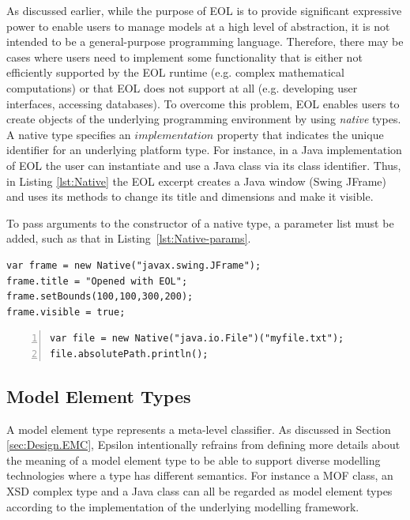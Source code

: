 As discussed earlier, while the purpose of EOL is to provide significant expressive power to enable users to manage models at a high level of abstraction, it is not intended to be a general-purpose programming language. Therefore, there may be cases where users need to implement some functionality that is either not efficiently supported by the EOL runtime (e.g. complex mathematical computations) or that EOL does not support at all (e.g. developing user interfaces, accessing databases). To overcome this problem, EOL enables users to create objects of the underlying programming environment by using \emph{native} types. A native type specifies an $implementation$ property that indicates the unique identifier for an underlying platform type. For instance, in a Java implementation of EOL the user can instantiate and use a Java class via its class identifier. Thus, in Listing \ref{lst:Native} the EOL excerpt creates a Java window (Swing JFrame) and uses its methods to change its title and dimensions and make it visible.

To pass arguments to the constructor of a native type, a parameter list must be added, such as that in Listing~\ref{lst:Native-params}.
\begin{lstlisting}[float=h, caption=Demonstration of NativeType in EOL, label=lst:Native, language=EOL]
var frame = new Native("javax.swing.JFrame");
frame.title = "Opened with EOL";
frame.setBounds(100,100,300,200);
frame.visible = true;
\end{lstlisting}

\begin{lstlisting}[float=h, caption=Demonstration of NativeType in EOL, label=lst:Native-params, numbers=left, language=EOL]
var file = new Native("java.io.File")("myfile.txt");
file.absolutePath.println();
\end{lstlisting}

\subsection{Model Element Types}

A model element type represents a meta-level classifier. As discussed in Section \ref{sec:Design.EMC}, Epsilon intentionally refrains from defining more details about the meaning of a model element type to be able to support diverse modelling technologies where a type has different semantics. For instance a MOF class, an XSD complex type and a Java class can all be regarded as model element types according to the implementation of the underlying modelling framework.

